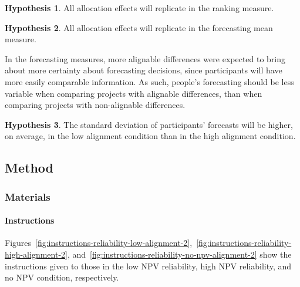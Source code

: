 \documentclass[a4paper, nobind, dvipsnames]{templates/ociamthesis}
\theoremstyle{definition}
\theoremstyle{definition}
\theoremstyle{definition}
\theoremstyle{definition}
\newtheorem{hypothesis}{Hypothesis}[chapter]
\theoremstyle{remark}
\begin{document}
\begin{hypothesis}
\protect\hypertarget{hyp:ranking-all-alignment-2}{}{\label{hyp:ranking-all-alignment-2} }All allocation effects will replicate in the ranking measure.
\end{hypothesis}

\begin{hypothesis}
\protect\hypertarget{hyp:forecasting-mean-all-alignment-2}{}{\label{hyp:forecasting-mean-all-alignment-2} }All allocation effects will replicate in the forecasting mean measure.
\end{hypothesis}

In the forecasting measures, more alignable differences were expected to bring
about more certainty about forecasting decisions, since participants will have
more easily comparable information. As such, people's forecasting should be less
variable when comparing projects with alignable differences, than when comparing
projects with non-alignable differences.

\begin{hypothesis}
\protect\hypertarget{hyp:forecasting-sd-alignment-alignment-2}{}{\label{hyp:forecasting-sd-alignment-alignment-2} }The standard deviation of participants' forecasts will be higher, on average,
in the low alignment condition than in the high alignment condition.
\end{hypothesis}

\subsection{Method}

\hypertarget{materials-alignment-2-appendix}{%
\subsubsection{Materials}\label{materials-alignment-2-appendix}}

\hypertarget{instructions-materials-alignment-2-appendix}{%
\paragraph{Instructions}\label{instructions-materials-alignment-2-appendix}}

Figures~\ref{fig:instructions-reliability-low-alignment-2},~\ref{fig:instructions-reliability-high-alignment-2},
and~\ref{fig:instructions-reliability-no-npv-alignment-2} show the instructions
given to those in the low NPV reliability, high NPV reliability, and no NPV
condition, respectively.
\end{document}
